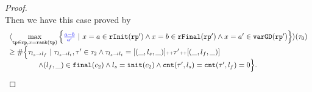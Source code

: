 \begin{proof}
\[\]
Then we have this case proved by
\[
  \begin{array}{l}
    \config{
      \max\limits_{\tpath \in \rprog, x = \locbound(\tpath)}
    \Big\{ \highlight{\frac{a - b}{a'}} ~\vert~ x = a \in \rfinit(\rprog')
    \land x = b \in \rffinal(\rprog') 
    \land x = a' \in \varGD(\rprog')
    \Big\}
    }(\trace_0) \\
    \geq
    \# \Big\{\trace_{l_s \to l_f} ~\vert~ \trace_{l_s \to l_t}, \trace' \in \trace_2 \land \trace_{l_s \to l_t} = [(\_, l_s, \_)] \tracecat \trace' \tracecat [(\_, l_f, \_)]
    \\ \qquad \qquad
    \land (l_{f}, \_) \in \absfinal(c_2)
    \land l_s = \absinit(c_2)
    \land \counter(\trace', l_s) = \counter(\trace', l_f) = 0 
    \Big\}.
    \end{array}
\]
\end{proof}